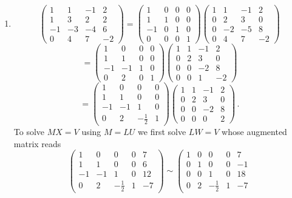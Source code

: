 \begin{enumerate}
\item
\[
\begin{pmatrix}
1&1&-1&2\\
1&3&2&2\\
-1&-3&-4&6\\
0&4&7&-2
\end{pmatrix}
=
\begin{pmatrix}
1&0&0&0\\
1&1&0&0\\
-1&0&1&0\\
0&0&0&1
\end{pmatrix}
\begin{pmatrix}
1&1&-1&2\\
0&2&3&0\\
0&-2&-5&8\\
0&4&7&-2
\end{pmatrix}
\]
\[
=
\begin{pmatrix}
1&0&0&0\\
1&1&0&0\\
-1&-1&1&0\\
0&2&0&1
\end{pmatrix}
\begin{pmatrix}
1&1&-1&2\\
0&2&3&0\\
0&0&-2&8\\
0&0&1&-2
\end{pmatrix}
\] \[=
\begin{pmatrix}
1&0&0&0\\
1&1&0&0\\
-1&-1&1&0\\
0&2&-\frac12&1
\end{pmatrix}
\begin{pmatrix}
1&1&-1&2\\
0&2&3&0\\
0&0&-2&8\\
0&0&0&2
\end{pmatrix}\, .
\]
To solve $MX=V$ using $M=LU$ we first solve $LW=V$ whose augmented matrix reads
\[
\left(
\begin{array}{cccc|c}
1&0&0&0&7\\
1&1&0&0&6\\
-1&-1&1&0&12\\
0&2&-\frac12&1&-7
\end{array}\right)
\sim 
\left(
\begin{array}{cccc|c}
1&0&0&0&7\\
0&1&0&0&-1\\
0&0&1&0&18\\
0&2&-\frac12&1&-7

\end{array}\]
\end{enumerate}
